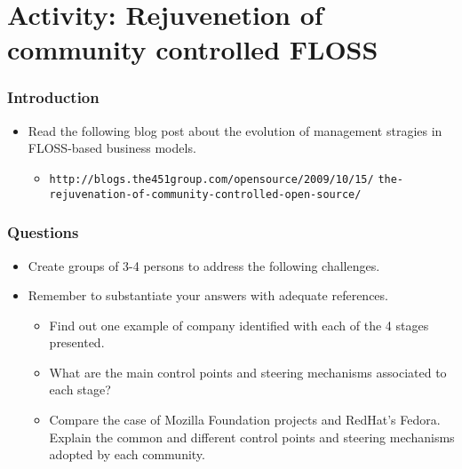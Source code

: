 
\section{Activity: Rejuvenetion of community controlled FLOSS}

\begin{frame}
\frametitle{Introduction}
\begin{itemize}
  \item Read the following blog post about the evolution of
management stragies in FLOSS-based business models.
  \begin{itemize}
   \item \footnotesize{\texttt{http://blogs.the451group.com/opensource/2009/10/15/}}
   \footnotesize{\texttt{the-rejuvenation-of-community-controlled-open-source/}}
  \end{itemize}
\end{itemize}
\end{frame}


\begin{frame}
\frametitle{Questions}
\begin{itemize}
  \item Create groups of 3-4 persons to address the following challenges.
  \item Remember to substantiate your answers with adequate references.
  \begin{itemize}
   \item Find out one example of company identified with each of the 4 stages presented.
   \item What are the main control points and steering mechanisms associated to each stage?
   \item Compare the case of Mozilla Foundation projects and RedHat's Fedora. Explain the
common and different control points and steering mechanisms adopted by each community.
  \end{itemize}
\end{itemize}
\end{frame}

